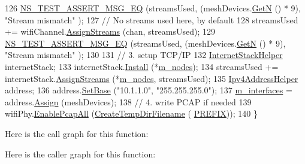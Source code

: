 \begin{DoxyCode}
126   \hyperlink{group__testing_ga2a9d78cffb3db8e867c35fff0b698cf5}{NS\_TEST\_ASSERT\_MSG\_EQ} (streamsUsed, (meshDevices.\hyperlink{classns3_1_1NetDeviceContainer_a74cafc212479bc38976bebd118e856b9}{GetN} () * 9), \textcolor{stringliteral}{"Stream mismatch"}
      );
127   \textcolor{comment}{// No streams used here, by default}
128   streamsUsed += wifiChannel.\hyperlink{classns3_1_1YansWifiChannelHelper_ab409a15cfb8abb5195177625191e2584}{AssignStreams} (chan, streamsUsed);
129   \hyperlink{group__testing_ga2a9d78cffb3db8e867c35fff0b698cf5}{NS\_TEST\_ASSERT\_MSG\_EQ} (streamsUsed, (meshDevices.\hyperlink{classns3_1_1NetDeviceContainer_a74cafc212479bc38976bebd118e856b9}{GetN} () * 9), \textcolor{stringliteral}{"Stream mismatch"}
      );
130 
131   \textcolor{comment}{// 3. setup TCP/IP}
132   \hyperlink{classns3_1_1InternetStackHelper}{InternetStackHelper} internetStack;
133   internetStack.\hyperlink{classns3_1_1InternetStackHelper_a6645b412f31283d2d9bc3d8a95cebbc0}{Install} (*\hyperlink{classHwmpProactiveRegressionTest_a523e4ee084993a1e8c192aef539cc119}{m\_nodes});
134   streamsUsed += internetStack.\hyperlink{classns3_1_1InternetStackHelper_a63c904e832a2f17e036338db4aa2f1b8}{AssignStreams} (*\hyperlink{classHwmpProactiveRegressionTest_a523e4ee084993a1e8c192aef539cc119}{m\_nodes}, streamsUsed);
135   \hyperlink{classns3_1_1Ipv4AddressHelper}{Ipv4AddressHelper} address;
136   address.\hyperlink{classns3_1_1Ipv4AddressHelper_acf7b16dd25bac67e00f5e25f90a9a035}{SetBase} (\textcolor{stringliteral}{"10.1.1.0"}, \textcolor{stringliteral}{"255.255.255.0"});
137   \hyperlink{classHwmpProactiveRegressionTest_ab9c5fde8692534990e2af2ffffad694a}{m\_interfaces} = address.\hyperlink{classns3_1_1Ipv4AddressHelper_af8e7f4a1a7e74c00014a1eac445a27af}{Assign} (meshDevices);
138   \textcolor{comment}{// 4. write PCAP if needed}
139   wifiPhy.\hyperlink{classns3_1_1PcapHelperForDevice_a4ab183a2512120200d4a0e5d8ececd49}{EnablePcapAll} (\hyperlink{classns3_1_1TestCase_a8a04695a6fb9ba0f89e28e9523963f88}{CreateTempDirFilename} (
      \hyperlink{hwmp-proactive-regression_8cc_a61dc66981fa47bfd0066a57a487c599c}{PREFIX}));
140 \}
\end{DoxyCode}


Here is the call graph for this function\+:




Here is the caller graph for this function\+:


